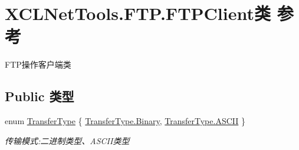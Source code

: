 \hypertarget{class_x_c_l_net_tools_1_1_f_t_p_1_1_f_t_p_client}{}\section{X\+C\+L\+Net\+Tools.\+F\+T\+P.\+F\+T\+P\+Client类 参考}
\label{class_x_c_l_net_tools_1_1_f_t_p_1_1_f_t_p_client}


F\+T\+P操作客户端类  


\subsection*{Public 类型}
\begin{DoxyCompactItemize}
\item 
enum \hyperlink{class_x_c_l_net_tools_1_1_f_t_p_1_1_f_t_p_client_adef28404af1c916d9bd2bfbfa924b707}{Transfer\+Type} \{ \hyperlink{class_x_c_l_net_tools_1_1_f_t_p_1_1_f_t_p_client_adef28404af1c916d9bd2bfbfa924b707a6ce976e8f061b2b5cfe4d0c50c3405dd}{Transfer\+Type.\+Binary}, 
\hyperlink{class_x_c_l_net_tools_1_1_f_t_p_1_1_f_t_p_client_adef28404af1c916d9bd2bfbfa924b707ad2cd8253361a9c732d21ca1d336599cc}{Transfer\+Type.\+A\+S\+C\+II}
 \}\begin{DoxyCompactList}\small\item\em 传输模式\+:二进制类型、\+A\+S\+C\+I\+I类型 \end{DoxyCompactList}
\end{DoxyCompactItemize}
